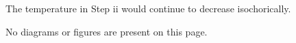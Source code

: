 The temperature in Step ii would continue to decrease isochorically.  

No diagrams or figures are present on this page.